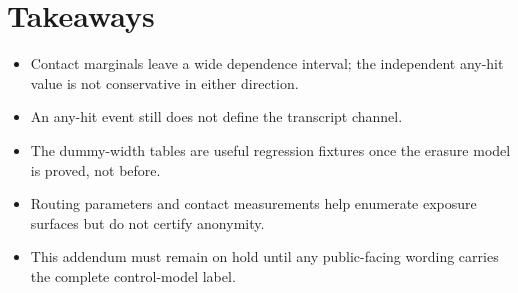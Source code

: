 \documentclass[11pt]{article}
\begin{document}
\section{Takeaways}
\begin{itemize}[leftmargin=*]
\item Contact marginals leave a wide dependence interval; the independent any-hit value is not conservative in either direction.
\item An any-hit event still does not define the transcript channel.
\item The dummy-width tables are useful regression fixtures once the erasure model is proved, not before.
\item Routing parameters and contact measurements help enumerate exposure surfaces but do not certify anonymity.
\item This addendum must remain on hold until any public-facing wording carries the complete control-model label.
\end{itemize}
\end{document}
